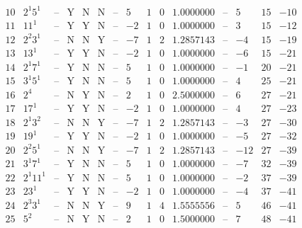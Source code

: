 \documentclass[11pt,reqno,a4letter]{article}
\numberwithin{figure}{section}
\numberwithin{table}{section}
\theoremstyle{plain}
\numberwithin{theorem}{section}
\theoremstyle{definition}
\begin{document}
\begin{table}[h!]
\begin{equation*}
{\begin{array}{|cc|c|ccc|c|c|ccc|c|ccc}
 10 & 2^1 5^1 & \text{--} & \text{Y} & \text{N} & \text{N} & \text{--} & 5 & 1 & 0 & 1.0000000 & \text{--} & 5 & 15 & -10 \\
 11 & 11^1 & \text{--} & \text{Y} & \text{Y} & \text{N} & \text{--} & -2 & 1 & 0 & 1.0000000 & \text{--} & 3 & 15 & -12 \\
 12 & 2^2 3^1 & \text{--} & \text{N} & \text{N} & \text{Y} & \text{--} & -7 & 1 & 2 & 1.2857143 & \text{--} & -4 & 15 & -19 \\
 13 & 13^1 & \text{--} & \text{Y} & \text{Y} & \text{N} & \text{--} & -2 & 1 & 0 & 1.0000000 & \text{--} & -6 & 15 & -21 \\
 14 & 2^1 7^1 & \text{--} & \text{Y} & \text{N} & \text{N} & \text{--} & 5 & 1 & 0 & 1.0000000 & \text{--} & -1 & 20 & -21 \\
 15 & 3^1 5^1 & \text{--} & \text{Y} & \text{N} & \text{N} & \text{--} & 5 & 1 & 0 & 1.0000000 & \text{--} & 4 & 25 & -21 \\
 16 & 2^4 & \text{--} & \text{N} & \text{Y} & \text{N} & \text{--} & 2 & 1 & 0 & 2.5000000 & \text{--} & 6 & 27 & -21 \\
 17 & 17^1 & \text{--} & \text{Y} & \text{Y} & \text{N} & \text{--} & -2 & 1 & 0 & 1.0000000 & \text{--} & 4 & 27 & -23 \\
 18 & 2^1 3^2 & \text{--} & \text{N} & \text{N} & \text{Y} & \text{--} & -7 & 1 & 2 & 1.2857143 & \text{--} & -3 & 27 & -30 \\
 19 & 19^1 & \text{--} & \text{Y} & \text{Y} & \text{N} & \text{--} & -2 & 1 & 0 & 1.0000000 & \text{--} & -5 & 27 & -32 \\
 20 & 2^2 5^1 & \text{--} & \text{N} & \text{N} & \text{Y} & \text{--} & -7 & 1 & 2 & 1.2857143 & \text{--} & -12 & 27 & -39 \\
 21 & 3^1 7^1 & \text{--} & \text{Y} & \text{N} & \text{N} & \text{--} & 5 & 1 & 0 & 1.0000000 & \text{--} & -7 & 32 & -39 \\
 22 & 2^1 11^1 & \text{--} & \text{Y} & \text{N} & \text{N} & \text{--} & 5 & 1 & 0 & 1.0000000 & \text{--} & -2 & 37 & -39 \\
 23 & 23^1 & \text{--} & \text{Y} & \text{Y} & \text{N} & \text{--} & -2 & 1 & 0 & 1.0000000 & \text{--} & -4 & 37 & -41 \\
 24 & 2^3 3^1 & \text{--} & \text{N} & \text{N} & \text{Y} & \text{--} & 9 & 1 & 4 & 1.5555556 & \text{--} & 5 & 46 & -41 \\
 25 & 5^2 & \text{--} & \text{N} & \text{Y} & \text{N} & \text{--} & 2 & 1 & 0 & 1.5000000 & \text{--} & 7 & 48 & -41 \\

\end{array}}
\end{equation*}
\end{table}
\end{document}
